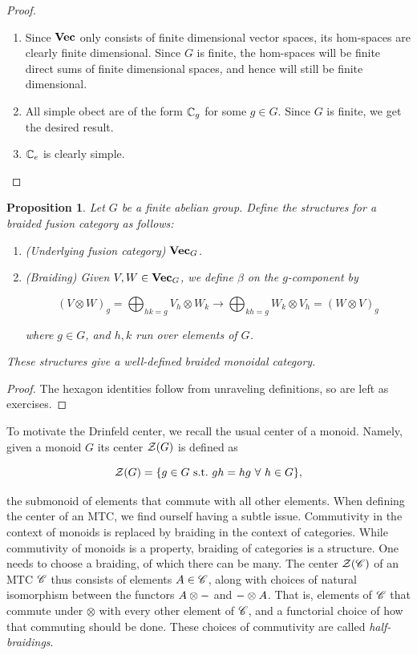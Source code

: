 \documentclass{article}
\newtheorem{proposition}{Proposition}[section]
\theoremstyle{definition}
\numberwithin{figure}{section}
\begin{document}
\begin{proof}
\begin{enumerate}
\item Since $\bold{Vec}$ only consists of finite dimensional vector spaces, its hom-spaces are clearly finite dimensional. Since $G$ is finite, the hom-spaces will be finite direct sums of finite dimensional spaces, and hence will still be finite dimensional.

\item All simple obect are of the form $\mathbb{C}_g$ for some $g\in G$. Since $G$ is finite, we get the desired result.

\item $\mathbb{C}_e$ is clearly simple.

\end{enumerate}
\end{proof}

\begin{proposition} Let $G$ be a finite abelian group. Define the structures for a braided fusion category as follows:

\begin{enumerate}
\item (Underlying fusion category) $\bold{Vec}_G$.
\item (Braiding) Given $V,W\in \bold{Vec}_G$, we define $\beta$ on the $g$-component by

$$\left(V\otimes W\right)_g = \bigoplus_{hk=g}V_h\otimes W_k \xrightarrow{} \bigoplus_{kh=g}W_k\otimes V_h=\left(W\otimes V\right)_g$$

where $g\in G$, and $h,k$ run over elements of $G$.
\end{enumerate}

These structures give a well-defined braided monoidal category.
\end{proposition}
\begin{proof} The hexagon identities follow from unraveling definitions, so are left as exercises.
\end{proof}


To motivate the Drinfeld center, we recall the usual center of a monoid. Namely, given a monoid $G$ its center $\mathcal{Z}(G)$ is defined as

$$\mathcal{Z}(G)=\{g\in G \,\,\mathrm{s.t.}\,\, gh=hg\,\,\forall\,\, h\in G\},$$

the submonoid of elements that commute with all other elements. When defining the center of an MTC, we find ourself having a subtle issue. Commutivity in the context of monoids is replaced by braiding in the context of categories. While commutivity of monoids is a property, braiding of categories is a structure. One needs to choose a braiding, of which there can be many. The center $\mathcal{Z}(\mathscr{C})$ of an MTC $\mathscr{C}$ thus consists of elements $A\in \mathscr{C}$, along with choices of natural isomorphism between the functors $A\otimes \--$ and $\-- \otimes A$. That is, elements of $\mathscr{C}$ that commute under $\otimes$ with every other element of $\mathscr{C}$, and a functorial choice of how that commuting should be done. These choices of commutivity are called \textit{half-braidings}.
\end{document}
